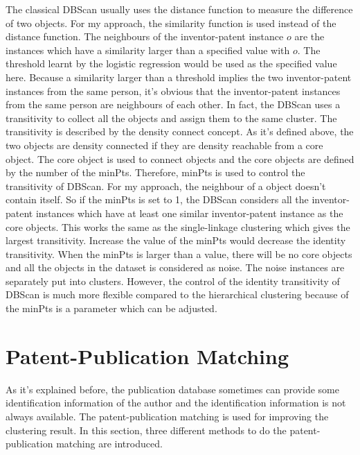 The classical DBScan usually uses the distance function to measure the difference of two objects. For my approach, the similarity function is used instead of the distance function. The neighbours of the inventor-patent instance $o$ are the instances which have a similarity larger than a specified value with $o$. The threshold learnt by the logistic regression would be used as the specified value here. Because a similarity larger than a threshold implies the two inventor-patent instances from the same person, it's obvious that the inventor-patent instances from the same person are neighbours of each other. In fact, the DBScan uses a transitivity to collect all the objects and assign them to the same cluster. The transitivity is described by the density connect concept. As it's defined above, the two objects are density connected if they are density reachable from a core object. The core object is used to connect objects and the core objects are defined by the number of the minPts.  
Therefore, minPts is used to control the transitivity of DBScan. For my approach, the neighbour of a object doesn't contain itself. So if the minPts is set to 1, the DBScan considers all the inventor-patent instances which have at least one similar inventor-patent instance as the core objects. This  works the same as the single-linkage clustering which gives the largest transitivity. Increase the value of the minPts would decrease the identity transitivity. When the minPts is larger than a value, there will be no core objects and all the objects in the dataset is considered as noise. The noise instances are separately put into clusters. However, the control of the identity transitivity of DBScan is much more flexible compared to the hierarchical clustering because of the minPts is a parameter which can be adjusted.  

\section{Patent-Publication Matching}
As it's explained before, the publication database sometimes can provide some identification information of the author and the identification information is not always available. The patent-publication matching is used for improving the clustering result. In this section, three different methods to do the patent-publication matching are introduced. 

